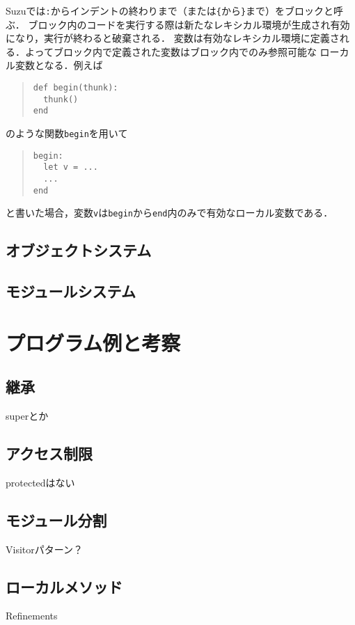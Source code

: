 \documentclass[a4paper,11pt,dvipdfmx]{jreport}
\begin{document}
Suzuでは\verb|:|からインデントの終わりまで（または\verb|{|から\verb|}|まで）をブロックと呼ぶ．
ブロック内のコードを実行する際は新たなレキシカル環境が生成され有効になり，実行が終わると破棄される．
変数は有効なレキシカル環境に定義される．よってブロック内で定義された変数はブロック内でのみ参照可能な
ローカル変数となる．例えば
\begin{quote}
\begin{verbatim}
def begin(thunk):
  thunk()
end
\end{verbatim}
\end{quote}
のような関数\verb|begin|を用いて
\begin{quote}
\begin{verbatim}
begin:
  let v = ...
  ...
end
\end{verbatim}
\end{quote}
と書いた場合，変数\verb|v|は\verb|begin|から\verb|end|内のみで有効なローカル変数である．

\section{オブジェクトシステム}




\section{モジュールシステム}


\chapter{プログラム例と考察}
\label{chapter:discussion}

\section{継承}
superとか

\section{アクセス制限}
protectedはない

\section{モジュール分割}
Visitorパターン？

\section{ローカルメソッド}
Refinements
\end{document}
